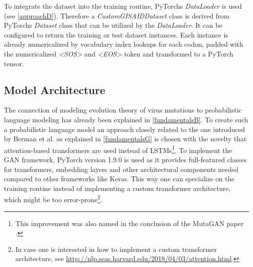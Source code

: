 To integrate the dataset into the training routine, PyTorchs \textit{DataLoader} is used (see \autoref{approachD}). Therefore a \textit{CustomGISAIDDataset} class is derived from PyTorchs \textit{Dataset} class that can be utilized by the \textit{DataLoader}. It can be configured to return the training or test dataset instances. Each instance is already numericalized by vocabulary index lookups for each codon, padded with the numericalized \textit{<SOS>} and \textit{<EOS>} token and transformed to a PyTorch tensor. 

\subsection{Model Architecture} \label{approachC}

The connection of modeling evolution theory of virus mutations to probabilistic language modeling has already been explained in \autoref{fundamentalsB}. To create such a probabilistic language model an approach closely related to the one introduced by Berman et al. \cite{Berman2020} as explained in \autoref{fundamentalsG} is chosen with the novelty that attention-based transformers are used instead of \acp{LSTM}\footnote{This improvement was also named in the conclusion of the MutaGAN paper \cite{Berman2020}.}. To implement the \ac{GAN} framework, PyTorch version 1.9.0 is used as it provides full-featured classes for transformers, embedding layers and other architectural components needed compared to other frameworks like Keras. This way one can specialize on the training routine instead of implementing a custom transformer architecture, which might be too error-prone\footnote{In case one is interested in how to implement a custom transformer architecture, see \url{http://nlp.seas.harvard.edu/2018/04/03/attention.html}.}. 

